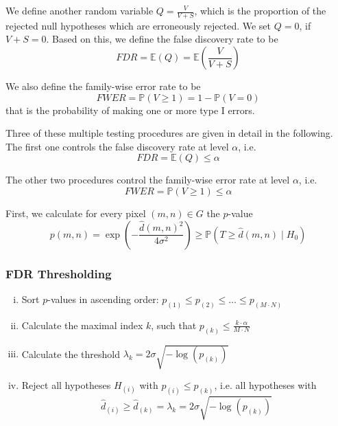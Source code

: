 \documentclass[a4paper,12pt]{article}
\theoremstyle{plain}
\theoremstyle{definition}
\theoremstyle{remark}
\begin{document}
We define another random variable $Q = \frac{V}{V + S}$, which is the proportion of the rejected null hypotheses which are erroneously rejected. We set $Q = 0$, if $V + S = 0$. Based on this, we define the false discovery rate to be
\begin{equation}
	FDR = \mathbb{E}(Q) = \mathbb{E} \left( \frac{V}{V + S} \right)
\end{equation}

We also define the family-wise error rate to be
\begin{equation}
	FWER = \mathbb{P}( V \geq 1 ) = 1 - \mathbb{P}( V = 0 )
\end{equation}
that is the probability of making one or more type I errors.

Three of these multiple testing procedures are given in detail in the following. The first one controls the false discovery rate at level $\alpha$, i.e.
\begin{equation}
	FDR = \mathbb{E}(Q) \leq \alpha
\end{equation}

The other two procedures control the family-wise error rate at level $\alpha$, i.e.
\begin{equation}
	FWER = \mathbb{P}( V \geq 1 ) \leq \alpha
\end{equation}

First, we calculate for every pixel $(m, n) \in G$ the $p$-value
\begin{equation}
	p(m, n) = \exp \left( - \frac{\hat{d}(m, n)^2}{4 \sigma^2} \right) \geq \mathbb{P}(T \geq \hat{d}(m, n) \mid H_0)
\end{equation}

\subsubsection{FDR Thresholding}
\begin{enumerate}[(i)]
	\item Sort $p$-values in ascending order: $p_{(1)} \leq p_{(2)} \leq \dots \leq p_{(M \cdot N)}$
	\item Calculate the maximal index $k$, such that $p_{(k)} \leq \frac{k \cdot \alpha}{M \cdot N}$
	\item Calculate the threshold $\lambda_{k} = 2 \sigma \sqrt{- \log(p_{(k)})}$
	\item Reject all hypotheses $H_{(i)}$ with $p_{(i)} \leq p_{(k)}$, i.e. all hypotheses with $$\hat{d}_{(i)} \geq \hat{d}_{(k)} = \lambda_{k} = 2 \sigma \sqrt{- \log(p_{(k)})}$$
\end{enumerate}
\end{document}
